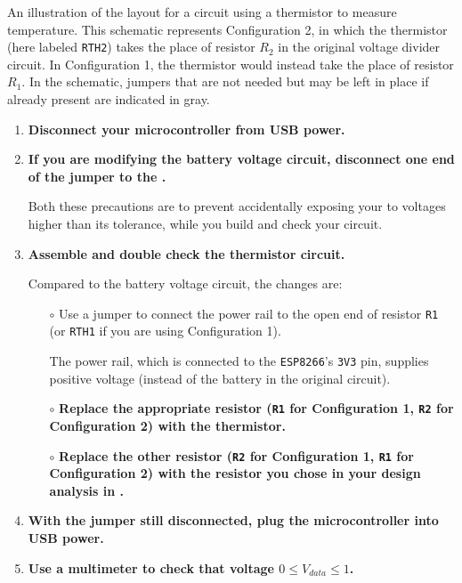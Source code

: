 \begin{marginfigure}[-8cm]
\begin{center}
		\caption[Thermistor circuit schematic]{An illustration of the layout for a circuit using a thermistor to measure temperature. 
		This schematic represents Configuration 2, in which the thermistor (here labeled \texttt{RTH2}) takes the place of resistor $R_2$ in the original voltage divider circuit.
		In Configuration 1, the thermistor would instead take the place of resistor $R_1$. 
		In the schematic, jumpers that are not needed but may be left in place if already present are indicated in gray.}
	\end{center}
\end{marginfigure}
\begin{enumerate}
	\item \textbf{Disconnect your microcontroller from USB power.}
	
	\item \textbf{If you are modifying the battery voltage circuit, disconnect one end of the jumper to the \adc.}
	
	Both these precautions are to prevent accidentally exposing your \adc to voltages higher than its tolerance, while you build and check your circuit. 

	\item \textbf{Assemble and double check the thermistor circuit.}

Compared to the battery voltage circuit, the changes are:
	\begin{itemize}
		\item[$\circ$] Use a jumper to connect the power rail to the open end of resistor \texttt{R1} (or \texttt{RTH1} if you are using Configuration 1).
		
		The power rail, which is connected to the \texttt{ESP8266}'s \texttt{3V3} pin, supplies positive voltage (instead of the battery in the original circuit). 
		\item[$\circ$] \textbf{Replace the appropriate resistor (\texttt{R1} for Configuration 1, \texttt{R2} for Configuration 2) with the thermistor.} 
		\item[$\circ$] \textbf{Replace the other resistor (\texttt{R2} for Configuration 1, \texttt{R1} for Configuration 2) with the resistor you chose in your design analysis in .}
	\end{itemize}	

	\item \textbf{With the \adc jumper still disconnected, plug the microcontroller into USB power.}
		
	\item \textbf{Use a multimeter to check that voltage $0 \le V_{data} \le 1$.}
	

\end{enumerate}
